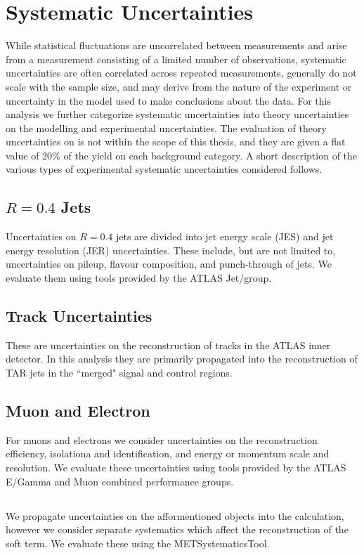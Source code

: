 \section{Systematic Uncertainties}
While statistical fluctuations are uncorrelated between measurements and arise from a measurement consisting of a limited number of observations, systematic uncertainties are often correlated across repeated measurements, generally do not scale with the sample size, and may derive from the nature of the experiment or uncertainty in the model used to make conclusions about the data.  For this analysis we further categorize systematic uncertainties into theory uncertainties on the modelling and experimental uncertainties. The evaluation of theory uncertainties on is not within the scope of this thesis, and they are given a flat value of 20\% of the yield on each background category. A short description of the various types of experimental systematic uncertainties considered follows.

\subsection{$R=0.4$ Jets}
Uncertainties on $R=0.4$ jets are divided into jet energy scale (JES) and jet energy resolution (JER) uncertainties. These include, but are not limited to, uncertainties on pileup, flavour composition, and punch-through of jets. We evaluate them using tools provided by the ATLAS Jet/\met group.

\subsection{Track Uncertainties}
These are uncertainties on the reconstruction of tracks in the ATLAS inner detector. In this analysis they are primarily propagated into the reconstruction of TAR jets in the ``merged" signal and control regions.

\subsection{Muon and Electron}
For muons and electrons we consider uncertainties on the reconstruction efficiency, isolationa and identification, and energy or momentum scale and resolution. We evaluate these uncertainties using tools provided by the ATLAS E/Gamma and Muon combined performance groups.

\subsection{\met}
We propagate uncertainties on the afformentioned objects into the \met calculation, however we consider separate \met systematics which affect the reconstruction of the \met soft term. We evaluate these using the METSystematicsTool.

